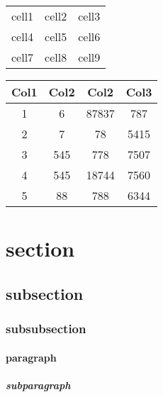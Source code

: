 \documentclass[12pt, a4paper]{article} %
\begin{document}
    \begin{center}
        \begin{tabular}{c c c}       %
            cell1 & cell2 & cell3 \\ %
            cell4 & cell5 & cell6 \\
            cell7 & cell8 & cell9
        \end{tabular}
    \end{center}

    \begin{center}
        \begin{tabular}{||c|c|c|c||}             %
            \hline                               %
            Col1 & Col2 & Col2 & Col3 \\ [0.5ex]
            \hline\hline
            1 & 6 & 87837 & 787 \\
            \hline
            2 & 7 & 78 & 5415 \\
            \hline
            3 & 545 & 778 & 7507 \\
            \hline
            4 & 545 & 18744 & 7560 \\
            \hline
            5 & 88 & 788 & 6344 \\ [1ex]
            \hline
        \end{tabular}
    \end{center}

    \section{section}
        \subsection{subsection}
            \subsubsection{subsubsection}
                \paragraph{paragraph}
                    \subparagraph{subparagraph}
\end{document}

